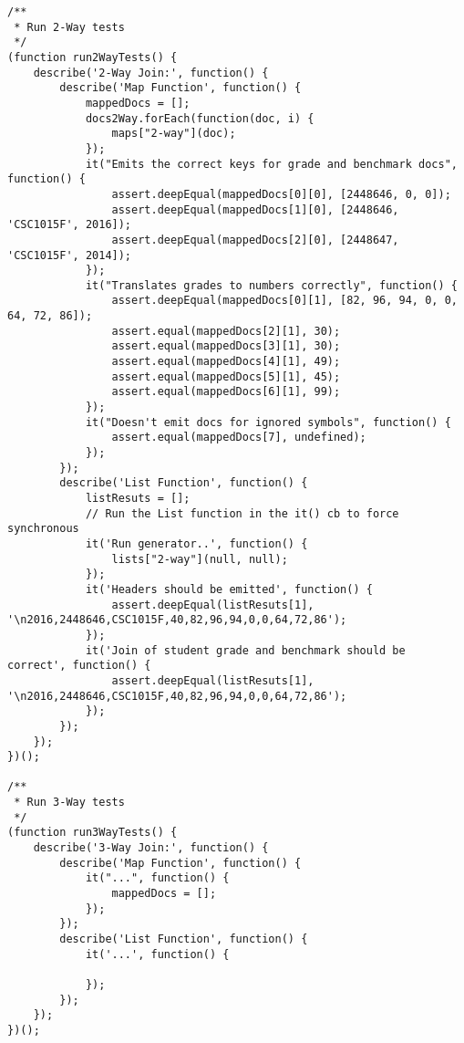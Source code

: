 \begin{verbatim}
/**
 * Run 2-Way tests
 */
(function run2WayTests() {
    describe('2-Way Join:', function() {
        describe('Map Function', function() {
            mappedDocs = [];
            docs2Way.forEach(function(doc, i) {
                maps["2-way"](doc);
            });
            it("Emits the correct keys for grade and benchmark docs", function() {
                assert.deepEqual(mappedDocs[0][0], [2448646, 0, 0]);
                assert.deepEqual(mappedDocs[1][0], [2448646, 'CSC1015F', 2016]);
                assert.deepEqual(mappedDocs[2][0], [2448647, 'CSC1015F', 2014]);
            });
            it("Translates grades to numbers correctly", function() {
                assert.deepEqual(mappedDocs[0][1], [82, 96, 94, 0, 0, 64, 72, 86]);
                assert.equal(mappedDocs[2][1], 30);
                assert.equal(mappedDocs[3][1], 30);
                assert.equal(mappedDocs[4][1], 49);
                assert.equal(mappedDocs[5][1], 45);
                assert.equal(mappedDocs[6][1], 99);
            });
            it("Doesn't emit docs for ignored symbols", function() {
                assert.equal(mappedDocs[7], undefined);
            });
        });
        describe('List Function', function() {
            listResuts = [];
            // Run the List function in the it() cb to force synchronous
            it('Run generator..', function() {
                lists["2-way"](null, null);
            });
            it('Headers should be emitted', function() {
                assert.deepEqual(listResuts[1], '\n2016,2448646,CSC1015F,40,82,96,94,0,0,64,72,86');
            });
            it('Join of student grade and benchmark should be correct', function() {
                assert.deepEqual(listResuts[1], '\n2016,2448646,CSC1015F,40,82,96,94,0,0,64,72,86');
            });
        });
    });
})();

/**
 * Run 3-Way tests
 */
(function run3WayTests() {
    describe('3-Way Join:', function() {
        describe('Map Function', function() {
            it("...", function() {
                mappedDocs = [];
            });
        });
        describe('List Function', function() {
            it('...', function() {

            });
        });
    });
})();
\end{verbatim}